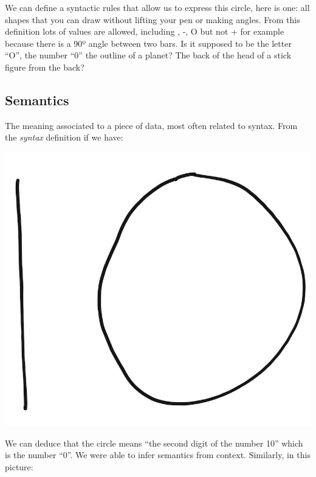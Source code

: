 \documentclass[
]{article}
\begin{document}
We can define a syntactic rules that allow us to express this circle,
here is one: all shapes that you can draw without lifting your pen or
making angles. From this definition lots of values are allowed,
including \textbar, -, O but not + for example because there is a 90º
angle between two bars. Is it supposed to be the letter ``O'', the
number ``0'' the outline of a planet? The back of the head of a stick
figure from the back?

\hypertarget{semantics-1}{%
\subsection{Semantics}\label{semantics-1}}

The meaning associated to a piece of data, most often related to syntax.
From the \emph{syntax} definition if we have:

\includegraphics{ten.jpg}

We can deduce that the circle means ``the second digit of the number
10'' which is the number ``0''. We were able to infer semantics from
context. Similarly, in this picture:
\end{document}
